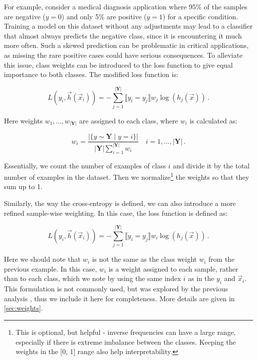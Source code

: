 For example, consider a medical diagnosis application where 95\% of the samples are negative ($y = 0$) and only 5\% are
positive ($y = 1$) for a specific condition. Training a model on this dataset without any adjustments may lead to a
classifier that almost always predicts the negative class, since it is encountering it much more often. Such a skewed
prediction can be problematic in critical applications, as missing the rare positive cases could have serious
consequences. To alleviate this issue, class weights can be introduced to the loss function to give equal importance to
both classes. The modified loss function is:

\begin{equation}
    \label{eq:weight-per-class}
    L(y_i, \vec{h}(\vec{x}_i)) = -\sum_{j = 1}^{|\textbf{Y}|} \llbracket y_i = y_j \rrbracket w_j \log(h_j(\vec{x}))\,.
\end{equation}

Here weights $w_1, \dots, w_{|\textbf{Y}|}$ are assigned to each class, where $w_i$ is calculated as:

\begin{equation}
    w_i = \frac{|\{y \sim \textbf{Y} \mid y = i\}|}{|\textbf{Y}| \sum_{i = 1}^{|\textbf{Y}|} w_i} \quad i = 1, \dots, |\textbf{Y}|\,.
\end{equation}

Essentially, we count the number of examples of class $i$ and divide it by the total number of examples in the dataset.
Then we normalize\footnote{This is optional, but helpful - inverse frequencies can have a large range, especially if
    there is extreme imbalance between the classes. Keeping the weights in the [0, 1] range also help interpretability.}
the weights so that they sum up to 1.


Similarly, the way the cross-entropy is defined, we can also introduce a more refined sample-wise weighting. In this
case, the loss function is defined as:

\begin{equation}
    \label{eq:weight-per-sample}
    L(y_i, \vec{h}(\vec{x}_i)) = -\sum_{j = 1}^{|\textbf{Y}|} \llbracket y_i = y_j \rrbracket w_i \log(h_j(\vec{x}))\,.
\end{equation}

Here we should note that $w_i$ is not the same as the class weight $w_i$ from the previous example. In this case, $w_i$
is a weight assigned to each sample, rather than to each class, which we note by using the same index $i$ as in the
$y_i$ and $\vec{x}_i$. This formulation is not commonly used, but was explored by the previous analysis
\cite{severin,jan}, thus we include it here for completeness. More details are given in \autoref{sec:weights}.

